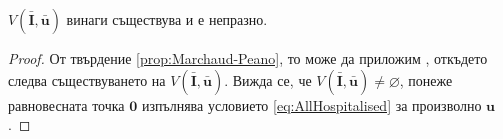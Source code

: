 
\begin{corollary}
  $V(\bar{\mathbf{I}}, \bar{\mathbf{u}})$ винаги съществува и е непразно.
\end{corollary}

\begin{proof}
  От твърдение \ref{prop:Marchaud-Peano}, то може да приложим \cite[теорема~4.1.2]{Aubin1991}, откъдето следва съществуването на $V(\bar{\mathbf{I}}, \bar{\mathbf{u}})$.
  Вижда се, че $V(\bar{\mathbf{I}}, \bar{\mathbf{u}}) \neq \varnothing$, понеже равновесната точка $\mathbf{0}$ изпълнява условието \eqref{eq:AllHospitalised} за произволно $\mathbf{u}$.
\end{proof}

